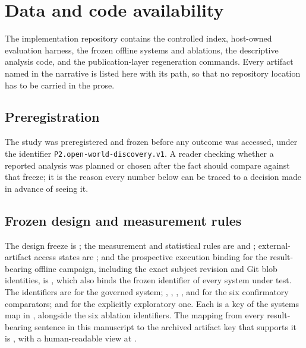\section{Data and code availability}
\label{sec:availability}

The implementation repository contains the controlled index, host-owned
evaluation harness, the frozen offline systems and ablations, the descriptive
analysis code, and the publication-layer regeneration commands.  Every artifact
named in the narrative is listed here with its path, so that no repository
location has to be carried in the prose.

\subsection*{Preregistration}

The study was preregistered and frozen before any outcome was accessed, under
the identifier \texttt{P2.open-world-discovery.v1}.  A reader checking whether a
reported analysis was planned or chosen after the fact should compare against
that freeze; it is the reason every number below can be traced to a decision
made in advance of seeing it.

\subsection*{Frozen design and measurement rules}

The design freeze is ; the measurement and
statistical rules are  and
; external-artifact access states are
; and the prospective execution
binding for the result-bearing offline campaign, including the exact subject
revision and Git blob identities, is
, which also binds the frozen
identifier of every system under test.  The identifiers are
 for the governed system; ,
, , ,
 and  for the
six confirmatory comparators; and  for the
explicitly exploratory one.  Each is a key of the systems map in
, alongside the six
ablation identifiers.  The mapping from every
result-bearing sentence in this manuscript to the archived artifact key that
supports it is , with a human-readable view
at .

